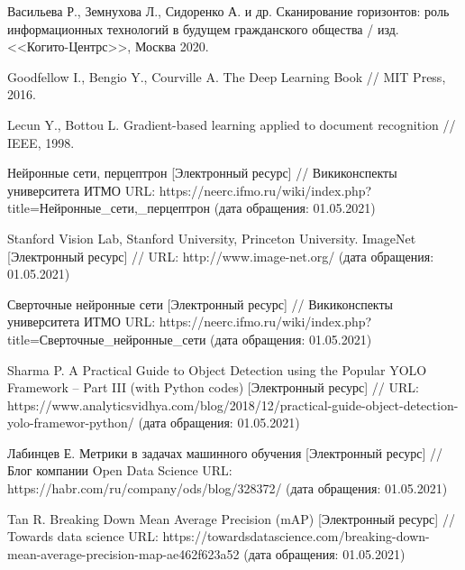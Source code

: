 \begingroup 
\renewcommand{\section}[2]{\anonsection{Список использованных источников}}
\begin{thebibliography}{00}

    Васильева Р., Земнухова Л., Сидоренко А. и др.
    Сканирование горизонтов: роль информационных технологий в будущем гражданского общества /
    изд. <<Когито-Центрс>>, Москва 2020.

    Goodfellow I., Bengio Y., Courville A.
    The Deep Learning Book //
    MIT Press, 2016.

    Lecun Y., Bottou L.
    Gradient-based learning applied to document recognition //
    IEEE, 1998.

    Нейронные сети, перцептрон
    [Электронный ресурс] //
    Викиконспекты университета ИТМО
    URL: https://neerc.ifmo.ru/wiki/index.php?title=Нейронные\_сети,\_перцептрон
    (дата обращения: 01.05.2021)

    Stanford  Vision  Lab,  Stanford  University,  Princeton  University.  ImageNet 
    [Электронный ресурс] //
    URL: http://www.image-net.org/
    (дата обращения: 01.05.2021)

    Сверточные нейронные сети
    [Электронный ресурс] //
    Викиконспекты университета ИТМО
    URL: https://neerc.ifmo.ru/wiki/index.php?title=Сверточные\_нейронные\_сети
    (дата обращения: 01.05.2021)

    Sharma  P.  A  Practical  Guide  to  Object  Detection  using  the  Popular YOLO Framework – Part  III  (with  Python  codes)
    [Электронный ресурс] //
    URL: https://www.analyticsvidhya.com/blog/2018/12/practical-guide-object-detection-yolo-framewor-python/
    (дата обращения: 01.05.2021)

    Лабинцев  Е.  Метрики в задачах машинного обучения
    [Электронный ресурс] //
    Блог компании Open Data Science
    URL: https://habr.com/ru/company/ods/blog/328372/
    (дата обращения: 01.05.2021)

    Tan R. Breaking Down Mean Average Precision (mAP)
    [Электронный ресурс] //
    Towards data science
    URL: https://towardsdatascience.com/breaking-down-mean-average-precision-map-ae462f623a52
    (дата обращения: 01.05.2021)


\end{thebibliography}
